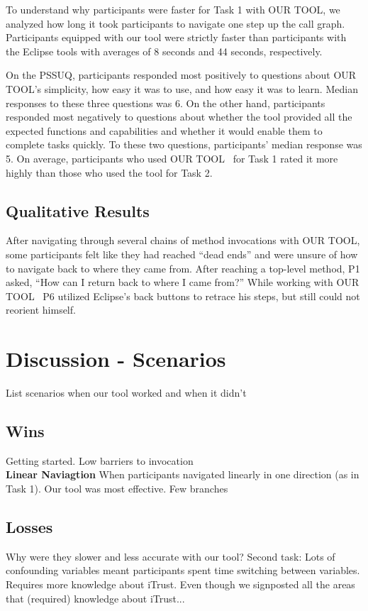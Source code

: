 \documentclass[conference]{IEEEtran}
\newcommand{\toolName}{OUR TOOL}
\begin{document}
To understand why participants were faster for Task 1 with \toolName, we analyzed how long it took participants to navigate one step up the call graph. Participants equipped with our tool were strictly faster than participants with the Eclipse tools with averages of 8 seconds and 44 seconds, respectively. 

On the PSSUQ, participants responded most positively to questions about \toolName's simplicity, how easy it was to use, and how easy it was to learn. 
Median responses to these three questions was 6.
On the other hand, participants responded most negatively to questions about whether the tool provided all the expected functions and capabilities and whether it would enable them to complete tasks quickly.
To these two questions, participants' median response was 5. 
On average, participants who used \toolName~ for Task 1 rated it more highly than those who used the tool for Task 2.


\subsection{Qualitative Results}

After navigating through several chains of method invocations with \toolName, some participants felt like they had reached ``dead ends'' and were unsure of how to navigate back to where they came from. After reaching a top-level method, P1 asked, ``How can I return back to where I came from?'' While working with \toolName~ P6 utilized Eclipse's back buttons to retrace his steps, but still could not reorient himself. 




\section{Discussion - Scenarios}
List scenarios when our tool worked and when it didn't
\subsection{Wins}
Getting started. Low barriers to invocation
\\
\textbf{Linear Naviagtion}
When participants navigated linearly in one direction (as in Task 1). Our tool was most effective. 
Few branches



\subsection{Losses}
Why were they slower and less accurate with our tool?
Second task: 
Lots of confounding variables meant participants spent time switching between variables.
Requires more knowledge about iTrust. Even though we signposted all the areas that (required) knowledge about iTrust...
\end{document}
